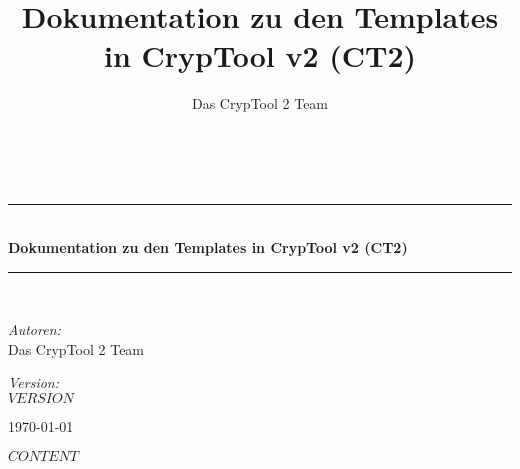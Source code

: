 \documentclass[10pt,a4paper]{scrreprt}
\title{Dokumentation zu den Templates in CrypTool v2 (CT2)}
\author{Das CrypTool 2 Team}
\newcommand{\HRule}{\rule{\linewidth}{0.5mm}}
\begin{document}
\begin{titlepage}
\begin{center}
\hspace{0pt}\\[2.5cm]

\HRule \\[0.4cm]
{ \huge \bfseries Dokumentation zu den Templates in CrypTool v2 (CT2) }\\[0.4cm]
\HRule \\[1.5cm]

\begin{minipage}{0.4\textwidth}
\begin{flushleft} \large
\emph{Autoren:} \\
Das CrypTool 2 Team
\end{flushleft}
\end{minipage}
\begin{minipage}{0.4\textwidth}
\begin{flushright} \large
\emph{Version:} \\
$VERSION$
\end{flushright}
\end{minipage}
\vfill
{\large \today}
\end{center}
\end{titlepage}

\tableofcontents
\newpage

$CONTENT$
\end{document}
